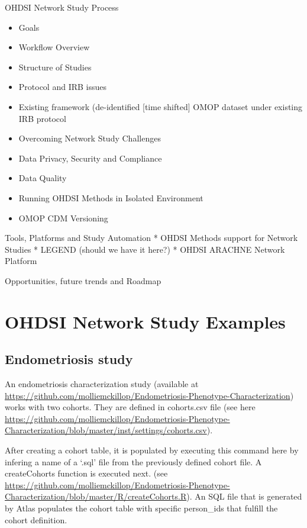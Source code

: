\documentclass[11pt]{book}
\providecommand{\tightlist}{%
  \setlength{\itemsep}{0pt}\setlength{\parskip}{0pt}}
\begin{document}
OHDSI Network Study Process

\begin{itemize}
\tightlist
\item
  Goals
\item
  Workflow Overview
\item
  Structure of Studies
\item
  Protocol and IRB issues
\item
  Existing framework (de-identified {[}time shifted{]} OMOP dataset
  under existing IRB protocol
\item
  Overcoming Network Study Challenges
\item
  Data Privacy, Security and Compliance
\item
  Data Quality
\item
  Running OHDSI Methods in Isolated Environment
\item
  OMOP CDM Versioning
\end{itemize}

Tools, Platforms and Study Automation * OHDSI Methods support for
Network Studies * LEGEND (should we have it here?) * OHDSI ARACHNE
Network Platform

Opportunities, future trends and Roadmap

\section{OHDSI Network Study
Examples}\label{ohdsi-network-study-examples}

\subsection{Endometriosis study}\label{endometriosis-study}

An endometriosis characterization study (available at
\url{https://github.com/molliemckillop/Endometriosis-Phenotype-Characterization})
works with two cohorts. They are defined in cohorts.csv file (see here
\url{https://github.com/molliemckillop/Endometriosis-Phenotype-Characterization/blob/master/inst/settings/cohorts.csv}).

After creating a cohort table, it is populated by executing this command
here by infering a name of a `.sql' file from the previously defined
cohort file. A createCohorts function is executed next. (see
\url{https://github.com/molliemckillop/Endometriosis-Phenotype-Characterization/blob/master/R/createCohorts.R}).
An SQL file that is generated by Atlas populates the cohort table with
specific person\_ids that fulfill the cohort definition.
\end{document}
